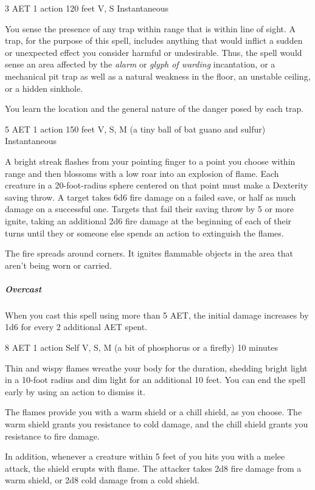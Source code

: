 {3 AET}
{1 action}
{120 feet}
{V, S}
{Instantaneous}

You sense the presence of any trap within range that is within line of sight. A trap, for the purpose of this spell, includes anything that would inflict a sudden or unexpected effect you consider harmful or undesirable. Thus, the spell would sense an area affected by the \textit{alarm} or \textit{glyph of warding} incantation, or a mechanical pit trap as well as a natural weakness in the floor, an unstable ceiling, or a hidden sinkhole.

You learn the location and the general nature of the danger posed by each trap.


{5 AET}
{1 action}
{150 feet}
{V, S, M (a tiny ball of bat guano and sulfur)}
{Instantaneous}

A bright streak flashes from your pointing finger to a point you choose within range and then blossoms with a low roar into an explosion of flame. Each creature in a 20-foot-radius sphere centered on that point must make a Dexterity saving throw. A target takes 6d6 fire damage on a failed save, or half as much damage on a successful one. Targets that fail their saving throw by 5 or more ignite, taking an additional 2d6 fire damage at the beginning of each of their turns until they or someone else spends an action to extinguish the flames. 

The fire spreads around corners. It ignites flammable objects in the area that aren't being worn or carried.

\subparagraph*{Overcast} When you cast this spell using more than 5 AET, the initial damage increases by 1d6 for every 2 additional AET spent.


{8 AET}
{1 action}
{Self}
{V, S, M (a bit of phosphorus or a firefly)}
{10 minutes}

Thin and wispy flames wreathe your body for the duration, shedding bright light in a 10-foot radius and dim light for an additional 10 feet. You can end the spell early by using an action to dismiss it.

The flames provide you with a warm shield or a chill shield, as you choose. The warm shield grants you resistance to cold damage, and the chill shield grants you resistance to fire damage.

In addition, whenever a creature within 5 feet of you hits you with a melee attack, the shield erupts with flame. The attacker takes 2d8 fire damage from a warm shield, or 2d8 cold damage from a cold shield.


